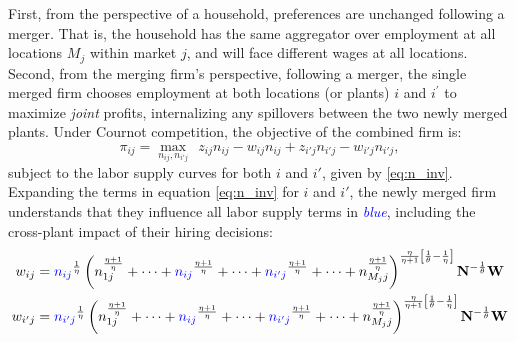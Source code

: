 \documentclass[12pt]{article}
\theoremstyle{prop}
\begin{document}
First, from the perspective of a household, preferences are unchanged following a merger. 
That is, the household has the same aggregator over employment at all locations $M_j$ within market $j$, and will face different wages at all locations.
Second, from the merging firm's perspective, following a merger, the single merged firm chooses employment at both locations (or plants) $i$ and $i^\prime$ to maximize \textit{joint} profits, internalizing any spillovers between the two newly merged plants. 
Under Cournot competition, the objective of the combined firm is:
\begin{equation*}
	\pi_{ij} = \max_{n_{ij}, n_{i'j}}\:\: z_{ij}  n_{ij}  -w_{ij}n_{ij} +z_{i'j}  n_{i'j}  -w_{i'j}n_{i'j},
\end{equation*}
subject to the labor supply curves for both $i$ and $i'$, given by \eqref{eq:n_inv}.
Expanding the terms in equation \eqref{eq:n_inv} for $i$ and $i'$, the newly merged firm understands that they influence all labor supply terms in \textcolor{blue}{\emph{blue}}, including the cross-plant impact of their hiring decisions:
\begin{align*}
	w_{ij} & =  \textcolor{blue}{n_{ij}} ^\frac{1}{\eta}\left(  n_{1j}^{\frac{\eta+1}{\eta}}+\dots+\textcolor{blue}{n_{ij}}^{\frac{\eta+1}{\eta}}+\dots + \textcolor{blue}{n_{i'j}}^{\frac{\eta+1}{\eta}}+\dots+ n_{M_{j}j}^{\frac{\eta+1}{\eta}}\right)^{\frac{\eta}{\eta+1}\left[{\frac{1}{\theta}-\frac{1}{\eta}}\right]} \mathbf{N}^{-\frac{1}{\theta}} \textbf{W} \\
		w_{i'j}& =  \textcolor{blue}{n_{i'j}} ^\frac{1}{\eta}\left(  n_{1j}^{\frac{\eta+1}{\eta}}+\dots+\textcolor{blue}{n_{ij}}^{\frac{\eta+1}{\eta}}+\dots + \textcolor{blue}{n_{i'j}}^{\frac{\eta+1}{\eta}}+\dots   +n_{M_{j}j}^{\frac{\eta+1}{\eta}}\right)^{\frac{\eta}{\eta+1}\left[{\frac{1}{\theta}-\frac{1}{\eta}}\right]} \mathbf{N}^{-\frac{1}{\theta}} \textbf{W}
\end{align*}
\end{document}

